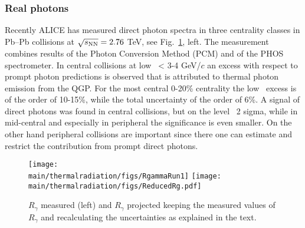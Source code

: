 \subsubsection{Real photons}

Recently ALICE has measured direct photon spectra in three centrality classes in Pb--Pb collisions at $\sqrt{s_{\rm NN}}=2.76$ TeV, see Fig.\ \ref{fig:RealPhotonsRg}, left. The measurement combines results of the Photon Conversion Method (PCM) and of the PHOS spectrometer. In central collisions at low \pT\  < 3-4 GeV/$c$ an excess with respect to prompt photon predictions is observed that is attributed to thermal photon emission from the QGP. For the most central 0-20\% centrality the low \pT \ excess is of the order of 10-15\%, while the total uncertainty of the order of 6\%. A signal of direct photons was found in central collisions, but on the level ~2 sigma, while in mid-central and especially in peripheral the significance is even smaller. On the other hand peripheral collisions are important since there one can estimate and restrict the contribution from prompt direct photons.  

\begin{figure}[hbt]
\centering
\texttt{[image: \\main/thermalradiation/figs/RgammaRun1]}
\hfill
\texttt{[image: \\main/thermalradiation/figs/ReducedRg.pdf]}
\caption{$R_{\gamma}$ measured \cite{Adam:2015lda} (left) and $R_{\gamma}$ projected keeping the measured values of $R_\gamma$ and recalculating the uncertainties as explained in the text.}
\label{fig:RealPhotonsRg}
\end{figure}

